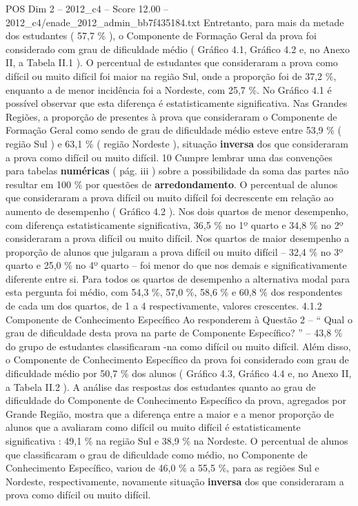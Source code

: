 \begin{textsample}{POS Dim 2 – 2012\_c4 – Score 12.00 – 2012\_c4/enade\_2012\_admin\_bb7f435184.txt}
Entretanto, para mais da metade dos estudantes ( 57,7 \% ), o Componente de Formação Geral da prova foi considerado com grau de dificuldade médio ( Gráfico 4.1, Gráfico 4.2 e, no Anexo II, a Tabela II.1 ).
O percentual de estudantes que consideraram a prova como difícil ou muito difícil foi maior na região Sul, onde a proporção foi de 37,2 \%, enquanto a de menor incidência foi a Nordeste, com 25,7 \%.
No Gráfico 4.1 é possível observar que esta diferença é estatisticamente significativa.
Nas Grandes Regiões, a proporção de presentes à prova que consideraram o Componente de Formação Geral como sendo de grau de dificuldade médio esteve entre 53,9 \% ( região Sul ) e 63,1 \% ( região Nordeste ), situação \textbf{inversa} dos que consideraram a prova como difícil ou muito difícil. 10 Cumpre lembrar uma das convenções para tabelas \textbf{numéricas} ( pág. iii ) sobre a possibilidade da soma das partes não resultar em 100 \% por questões de \textbf{arredondamento}.
O percentual de alunos que consideraram a prova difícil ou muito difícil foi decrescente em relação ao aumento de desempenho ( Gráfico 4.2 ).
Nos dois quartos de menor desempenho, com diferença estatisticamente significativa, 36,5 \% no 1º quarto e 34,8 \% no 2º consideraram a prova difícil ou muito difícil.
Nos quartos de maior desempenho a proporção de alunos que julgaram a prova difícil ou muito difícil – 32,4 \% no 3º quarto e 25,0 \% no 4º quarto – foi menor do que nos demais e significativamente diferente entre si.
Para todos os quartos de desempenho a alternativa modal para esta pergunta foi médio, com 54,3 \%, 57,0 \%, 58,6 \% e 60,8 \% dos respondentes de cada um dos quartos, de 1 a 4 respectivamente, valores crescentes. 4.1.2 Componente de Conhecimento Específico Ao responderem à Questão 2 – “ Qual o grau de dificuldade desta prova na parte de Componente Específico? ” – 43,8 \% do grupo de estudantes classificaram -na como difícil ou muito difícil.
Além disso, o Componente de Conhecimento Específico da prova foi considerado com grau de dificuldade médio por 50,7 \% dos alunos ( Gráfico 4.3, Gráfico 4.4 e, no Anexo II, a Tabela II.2 ).
A análise das respostas dos estudantes quanto ao grau de dificuldade do Componente de Conhecimento Específico da prova, agregados por Grande Região, mostra que a diferença entre a maior e a menor proporção de alunos que a avaliaram como difícil ou muito difícil é estatisticamente significativa : 49,1 \% na região Sul e 38,9 \% na Nordeste.
O percentual de alunos que classificaram o grau de dificuldade como médio, no Componente de Conhecimento Específico, variou de 46,0 \% a 55,5 \%, para as regiões Sul e Nordeste, respectivamente, novamente situação \textbf{inversa} dos que consideraram a prova como difícil ou muito difícil.

\end{textsample}
